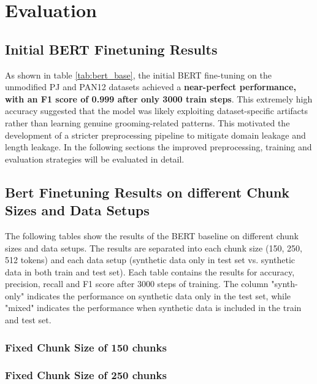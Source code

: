 \chapter{Evaluation} \label{sec:evaluation} 

\section{Initial BERT Finetuning Results}


As shown in table \ref{tab:bert_base}, the initial BERT fine-tuning on the unmodified PJ and PAN12 datasets achieved a \textbf{near-perfect performance, with an F1 score of 0.999 after only 3000 train steps}. This extremely high accuracy suggested that the model was likely exploiting dataset-specific artifacts rather than learning genuine grooming-related patterns. This motivated the development of a stricter preprocessing pipeline to mitigate domain leakage and length leakage. In the following sections the improved preprocessing, training and evaluation strategies will be evaluated in detail.

\newpage

\section{Bert Finetuning Results on different Chunk Sizes and Data Setups} \label{sec:bert_chunk_size_and_data_setup}

The following tables show the results of the BERT baseline on different chunk sizes and data setups. The results are separated into each chunk size (150, 250, 512 tokens) and each data setup (synthetic data only in test set vs. synthetic data in both train and test set). Each table contains the results for accuracy, precision, recall and F1 score after 3000 steps of training. The column "synth-only" indicates the performance on synthetic data only in the test set, while "mixed" indicates the performance when synthetic data is included in the train and test set.

\subsection{Fixed Chunk Size of 150 chunks}




\subsection{Fixed Chunk Size of 250 chunks}



